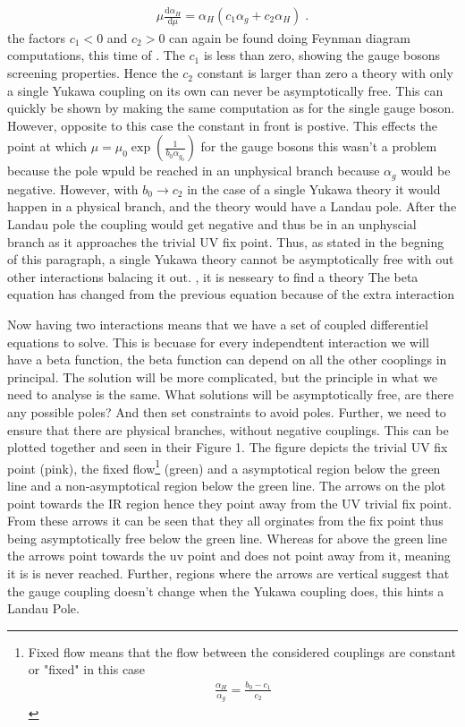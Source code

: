 \begin{align}
    \mu \frac{\mathrm{d} \alpha_H}{\mathrm{d} \mu}=\alpha_H (c_1\alpha_g+c_2 \alpha_H)\;.
\end{align}
 the factors $c_1<0$ and $c_2>0$ can again be found doing Feynman diagram computations, this time of . The $c_1$ is less than zero, showing the gauge bosons screening properties. Hence the $c_2$ constant is larger than zero a theory with only a single Yukawa coupling on its own can never be asymptotically free. This can quickly be shown by making the same computation as for the single gauge boson. However, opposite to this case the constant in front is postive. This effects the point at which $\mu=\mu_0\exp\left(\frac{1}{b_0\alpha_{g_0}}\right)$ for the gauge bosons this wasn't a problem because the pole wpuld be reached in an unphysical branch because $\alpha_g$ would be negative. However, with $b_0\to c_2$ in the case of a single Yukawa theory it would happen in a physical branch, and the theory would have a Landau pole. After the Landau pole the coupling would get negative and thus be in an unphyscial branch as it approaches the trivial UV fix point. Thus, as stated in the begning of this paragraph, a single Yukawa theory cannot be asymptotically free with out other interactions balacing it out. , it is nesseary to find a theory The beta equation has changed from the previous equation because of the extra interaction 

Now having two interactions means that we have a set of coupled differentiel equations to solve. This is becuase for every independtent interaction we will have a beta function, the beta function can depend on all the other cooplings in principal. The solution will be more complicated, but the principle in what we need to analyse is the same. What solutions will be asymptotically free, are there any possible poles? And then set constraints to avoid poles. Further, we need to ensure that there are physical branches, without negative couplings. This can be plotted together and seen in their Figure 1. The figure depicts the trivial UV fix point (pink), the fixed flow\footnote{Fixed flow means that the flow between the considered couplings are constant or "fixed" in this case \begin{align*}
\frac{\alpha_H}{\alpha_g}=\frac{b_0-c_1}{c_2}
\end{align*} } (green) and a asymptotical region below the green line and a non-asymptotical region below the green line. The arrows on the plot point towards the IR region hence they point away from the UV trivial fix point. From these arrows it can be seen that they all orginates from the fix point thus being asymptotically free below the green line. Whereas for above the green line the arrows point towards the uv point and does not point away from it, meaning it is is never reached. Further, regions where the arrows are vertical suggest that the gauge coupling doesn't change when the Yukawa coupling does, this hints a Landau Pole. 

